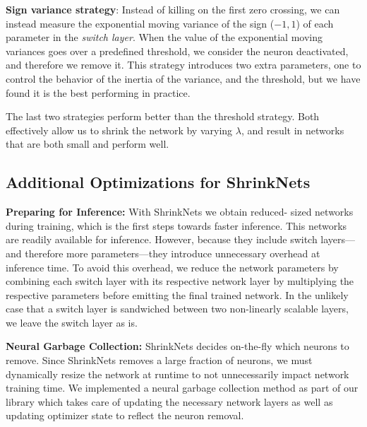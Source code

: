 \textbf{Sign variance strategy}: Instead of killing  on the first zero
crossing, we can instead measure the exponential moving variance of the sign
($-1, 1$) of each parameter in the \textit{switch layer}. When the value of
the exponential moving variances goes over a predefined threshold, we consider
the neuron deactivated, and therefore we remove it. This strategy introduces
two extra parameters, one to control the behavior of the inertia of the
variance, and the threshold, but we have found it is the best performing in
practice.

The last two strategies perform better than the threshold strategy.  Both
effectively allow us to shrink the network by varying $\lambda$, and result in
networks that are both small and perform well.


\subsection{Additional Optimizations for ShrinkNets}

\noindent\textbf{Preparing for Inference: } With ShrinkNets we obtain reduced-
sized networks during training, which is the first steps towards faster
inference. This networks are readily available for inference. However, because
they include switch layers---and therefore more parameters---they introduce
unnecessary overhead at inference time. To avoid this overhead, we reduce the
network parameters by combining each switch layer with its respective network
layer by multiplying the respective parameters before emitting the final
trained network. In the unlikely case that a switch layer is sandwiched
between two non-linearly scalable layers, we leave the switch layer as is.

\noindent\textbf{Neural Garbage Collection: }ShrinkNets decides on-the-fly
which neurons to remove. Since ShrinkNets removes a large fraction of neurons,
we must dynamically resize the network at runtime to not unnecessarily impact
network training time. We implemented a neural garbage collection method as
part of our library which takes care of updating the necessary network layers
as well as updating optimizer state to reflect the neuron removal.


